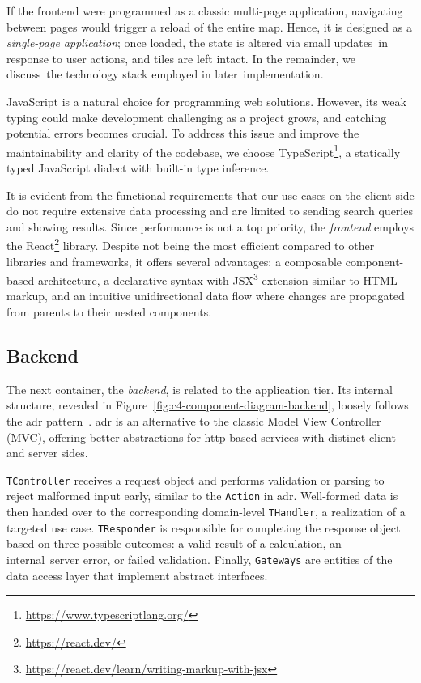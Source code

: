 If the frontend were programmed as a classic multi-page application, navigating between pages would trigger a reload of the entire map. Hence, it is designed as a \emph{single-page application}; once loaded, the state is altered via small updates~in response to user actions, and tiles are left intact. In the remainder, we discuss~the technology stack employed in later~im\-ple\-men\-ta\-tion.

JavaScript is a natural choice for programming web solutions. However, its weak typing could make development challenging as a project grows, and catching potential errors becomes crucial. To address this issue and improve the maintainability and clarity of the codebase, we choose TypeScript\footnote{\href{https://www.typescriptlang.org/}{https://www.typescriptlang.org/}}, a statically typed JavaScript dialect with built-in type inference.

It is evident from the functional requirements that our use cases on the client side do not require extensive data processing and are limited to sending search queries and showing results. Since performance is not a top priority, the \emph{frontend} employs the React\footnote{\href{https://react.dev/}{https://react.dev/}} library. Despite not being the most efficient compared to other libraries and frameworks, it offers several advantages: a composable component-based architecture, a declarative syntax with JSX\footnote{\href{https://react.dev/learn/writing-markup-with-jsx}{https://react.dev/learn/writing-markup-with-jsx}} extension similar to HTML markup, and an intuitive unidirectional data flow where changes are propagated from parents to their nested components.

\subsection{Backend}\label{ssec:design-backend}


The next container, the \emph{backend}, is related to the application tier. Its internal structure, revealed in Figure~\ref{fig:c4-component-diagram-backend}, loosely follows the \ac{adr} pattern~\cite{adr}. \acs{adr} is an alternative to the classic Model View Controller (MVC), offering better abstractions for \acs{http}-based services with distinct client and server sides.

\texttt{TController} receives a request object and performs validation or parsing to reject malformed input early, similar to the \texttt{Action} in \acs{adr}. Well-formed data is then handed over to the corresponding domain-level \texttt{THandler}, a re\-al\-iza\-tion of a targeted use case. \texttt{TResponder} is responsible for completing the response object based on three possible outcomes: a valid result of a calculation, an internal~server error, or failed validation. Finally, \texttt{Gateways} are entities of the data access layer that implement abstract interfaces.

